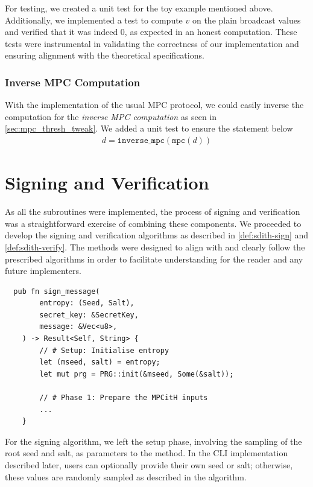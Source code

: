 \documentclass[11pt]{report}
\theoremstyle{definition}
\theoremstyle{plain}
\begin{document}
For testing, we created a unit test for the toy example mentioned above. Additionally, we implemented a test to compute $v$ on the plain broadcast values and verified that it was indeed $0$, as expected in an honest computation. These tests were instrumental in validating the correctness of our implementation and ensuring alignment with the theoretical specifications.

\subsubsection{Inverse MPC Computation}

With the implementation of the usual MPC protocol, we could easily inverse the computation for the \textit{inverse MPC computation} as seen in \autoref{sec:mpc_thresh_tweak}. We added a unit test to ensure the statement below
\begin{align*}
  d = \texttt{inverse\_mpc}(\texttt{mpc}(d))
\end{align*}

\section{Signing and Verification}\label{sub:signing_verification}
As all the subroutines were implemented, the process of signing and verification was a straightforward exercise of combining these components. We proceeded to develop the signing and verification algorithms as described in \autoref{def:sdith-sign} and \autoref{def:sdith-verify}. The methods were designed to align with and clearly follow the prescribed algorithms in order to facilitate understanding for the reader and any future implementers.

\begin{verbatim}
  pub fn sign_message(
        entropy: (Seed, Salt),
        secret_key: &SecretKey,
        message: &Vec<u8>,
    ) -> Result<Self, String> {
        // # Setup: Initialise entropy
        let (mseed, salt) = entropy;
        let mut prg = PRG::init(&mseed, Some(&salt));

        // # Phase 1: Prepare the MPCitH inputs
        ...
    }
\end{verbatim}

For the signing algorithm, we left the setup phase, involving the sampling of the root seed and salt, as parameters to the method. In the CLI implementation described later, users can optionally provide their own seed or salt; otherwise, these values are randomly sampled as described in the algorithm.
\end{document}
